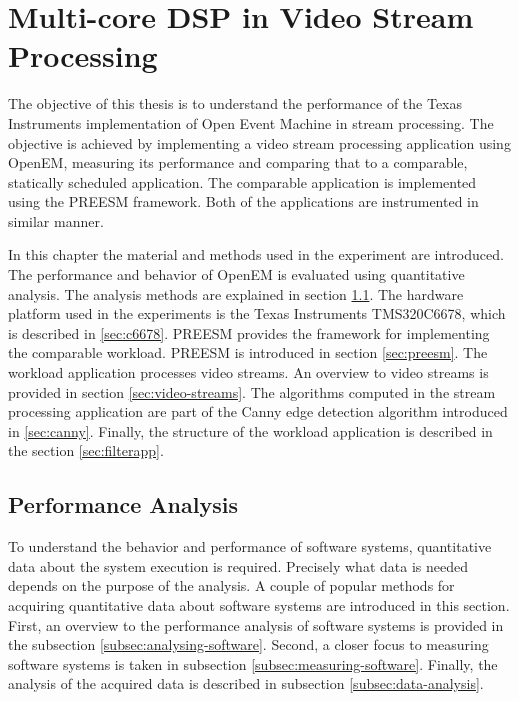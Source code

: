 \chapter{Multi-core DSP in Video Stream Processing}
\label{chapter:experiments}
The objective of this thesis is to understand the performance of the Texas Instruments implementation of Open Event Machine in stream processing. The objective is achieved by implementing a video stream processing application using OpenEM, measuring its performance and comparing that to a comparable, statically scheduled application. The comparable application is implemented using the PREESM framework. Both of the applications are instrumented in similar manner.

In this chapter the material and methods used in the experiment are introduced. The performance and behavior of OpenEM is evaluated using quantitative analysis. The analysis methods are explained in section \ref{sec:performance-analysis}. The hardware platform used in the experiments is the Texas Instruments TMS320C6678, which is described in \ref{sec:c6678}. PREESM provides the framework for implementing the comparable workload. PREESM is introduced in section \ref{sec:preesm}. The workload application processes video streams. An overview to video streams is provided in section \ref{sec:video-streams}. The algorithms computed in the stream processing application are part of the Canny edge detection algorithm introduced in \ref{sec:canny}. Finally, the structure of the workload application is described in the section \ref{sec:filterapp}.

\section{Performance Analysis}
\label{sec:performance-analysis}
To understand the behavior and performance of software systems, quantitative data about the system execution is required. Precisely what data is needed depends on the purpose of the analysis. A couple of popular methods for acquiring quantitative data about software systems are introduced in this section. First, an overview to the performance analysis of software systems is provided in the subsection \ref{subsec:analysing-software}. Second, a closer focus to measuring software systems is taken in subsection \ref{subsec:measuring-software}. Finally, the analysis of the acquired data is described in subsection \ref{subsec:data-analysis}.

